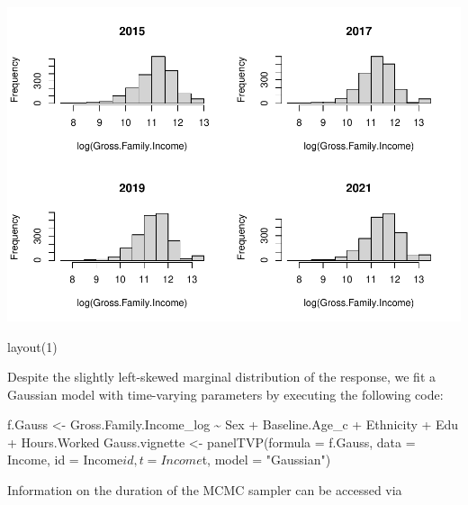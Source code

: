 \documentclass[a4paper, preprint, 3p,
authoryear]{elsarticle} %
\newenvironment{Shaded}{\begin{snugshade}}{\end{snugshade}}
\newcommand{\NormalTok}[1]{#1}
\newcommand{\pandocbounded}[1]{#1}
\begin{document}
\pandocbounded{\includegraphics[keepaspectratio]{Vignette-for-panelTVP_files/figure-latex/unnamed-chunk-13-1.pdf}}

\begin{Shaded}
\begin{Highlighting}[]
\NormalTok{layout(1)}
\end{Highlighting}
\end{Shaded}

Despite the slightly left-skewed marginal distribution of the response,
we fit a Gaussian model with time-varying parameters by executing the
following code:

\begin{Shaded}
\begin{Highlighting}[]
\NormalTok{f.Gauss \textless{}{-} Gross.Family.Income\_log \textasciitilde{} Sex + Baseline.Age\_c + Ethnicity + Edu + Hours.Worked}
\NormalTok{Gauss.vignette \textless{}{-} panelTVP(formula = f.Gauss,}
\NormalTok{                           data = Income,}
\NormalTok{                           id = Income$id,}
\NormalTok{                           t = Income$t,}
\NormalTok{                           model = "Gaussian")}
\end{Highlighting}
\end{Shaded}

Information on the duration of the MCMC sampler can be accessed via

\begin{Shaded}
\end{Shaded}
\end{document}
